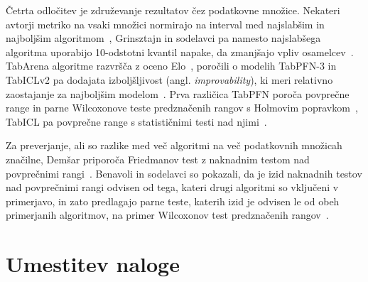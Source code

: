 \documentclass[a4paper,12pt,openright]{book}
\begin{document}
Četrta odločitev je združevanje rezultatov čez podatkovne množice. Nekateri
avtorji metriko na vsaki množici normirajo na interval med najslabšim in
najboljšim algoritmom~\cite{hollmann2025tabpfn}, Grinsztajn in sodelavci pa
namesto najslabšega algoritma uporabijo 10-odstotni kvantil napake, da
zmanjšajo vpliv osamelcev~\cite{grinsztajn2022why}.
TabArena
algoritme razvršča z oceno Elo~\cite{erickson2025tabarena}, poročili o modelih
TabPFN-3 in TabICLv2 pa dodajata izboljšljivost (angl. \emph{improvability}),
ki meri relativno zaostajanje za najboljšim
modelom~\cite{grinsztajn2026tabpfn3,qu2026tabiclv2}. Prva različica TabPFN poroča povprečne
range in parne Wilcoxonove teste predznačenih rangov s Holmovim popravkom~\cite{hollmann2023tabpfn},
TabICL pa povprečne range s statističnimi testi nad njimi~\cite{qu2025tabicl}.

Za preverjanje, ali so razlike med več algoritmi na več podatkovnih množicah
značilne, Demšar
priporoča Friedmanov test z naknadnim testom nad
povprečnimi rangi~\cite{demsar2006statistical}. Benavoli in sodelavci so pokazali, da je
izid naknadnih testov nad povprečnimi rangi odvisen od tega, kateri drugi
algoritmi so vključeni v primerjavo, in zato predlagajo parne teste, katerih
izid je odvisen le od obeh primerjanih algoritmov, na primer Wilcoxonov test
predznačenih rangov~\cite{benavoli2016should}.

\section{Umestitev naloge}
\label{sec:sor-umestitev}
\end{document}
